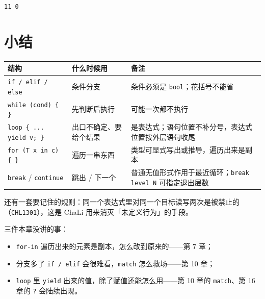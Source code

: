 \par
\medskip
\begin{lstlisting}[style=out]
11 0
\end{lstlisting}
\par
\medskip

\section{小结}

{\small\setlength{\tabcolsep}{4pt}
\begin{longtable}{>{\raggedright\arraybackslash}p{}>{\raggedright\arraybackslash}p{}>{\raggedright\arraybackslash}p{}}
\toprule
结构 & 什么时候用 & 备注 \\
\midrule
\endhead
\texttt{if /\allowbreak{} elif /\allowbreak{} else} & 条件分支 & 条件必须是 \texttt{bool}；花括号不能省 \\
\texttt{while (\allowbreak{}cond)\allowbreak{} \{ \}} & 先判断后执行 & 可能一次都不执行 \\
\texttt{loop \{ .\allowbreak{}.\allowbreak{}.\allowbreak{} yield v; \}} & 出口不确定、要给个结果 & 是表达式；语句位置不补分号，表达式位置按外层语句收尾 \\
\texttt{for (\allowbreak{}T x in c)\allowbreak{} \{ \}} & 遍历一串东西 & 类型可显式写出或推导，遍历出来是副本 \\
\texttt{break} / \texttt{continue} & 跳出 / 下一个 & 普通无值形式作用于最近循环；\texttt{break level N} 可指定退出层数 \\
\bottomrule
\end{longtable}
}

还有一套要记住的规则：同一个表达式里对同一个目标读写两次是被禁止的 （\texttt{CHL1301}），这是 ChaLi 用来消灭「未定义行为」的手段。

三件本章没讲的事：

\begin{itemize}

\item \texttt{for-in} 遍历出来的元素是副本，怎么改到原来的——第 7 章；

\item 分支多了 \texttt{if /\allowbreak{} elif} 会很难看，\texttt{match} 怎么救场——第 10 章；

\item \texttt{loop} 里 \texttt{yield} 出来的值，除了赋值还能怎么用——第 10 章的 \texttt{match}、第 16 章的 \texttt{?} 会陆续出现。

\end{itemize}

